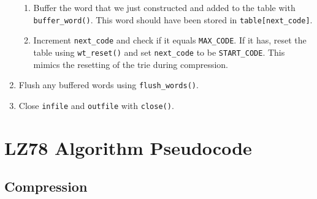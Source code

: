 \documentclass{article}
\begin{document}
\begin{enumerate}
\begin{enumerate}
            \item Buffer the word that we just constructed and added to the
                table with \texttt{buffer\_word()}. This word should have been
                stored in \texttt{table[next\_code]}.

            \item Increment \texttt{next\_code} and check if it equals
                \texttt{MAX\_CODE}. If it has, reset the table using
                \texttt{wt\_reset()} and set \texttt{next\_code} to be
                \texttt{START\_CODE}. This mimics the resetting of the trie
                during compression.
        \end{enumerate}

    \item Flush any buffered words using \texttt{flush\_words()}.

    \item Close \texttt{infile} and \texttt{outfile} with \texttt{close()}.
\end{enumerate}


\section{LZ78 Algorithm Pseudocode}

\subsection{Compression}
\end{document}
